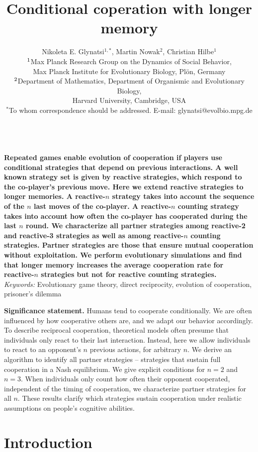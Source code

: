 \documentclass[11pt]{article}
\title{\bfseries \sffamily \Large Conditional coperation with longer memory}
\author{Nikoleta E. Glynatsi$^{1,*}$, Martin Nowak$^2$, Christian Hilbe$^1$\\[0.3cm]
$^{\rm 1}$Max Planck Research Group on the Dynamics of Social Behavior,\\ Max Planck Institute for Evolutionary Biology, Pl\"{o}n, Germany \\
$^{\rm 2}$Department of Mathematics,
Department of Organismic and Evolutionary Biology,\\ Harvard University, Cambridge, USA\\
$^*$To whom correspondence should be addressed. E-mail: glynatsi@evolbio.mpg.de
}
\date{}
\begin{document}
\maketitle

~\\[0.5cm]
\noindent
{\bf 
Repeated games enable evolution of cooperation if players use conditional
strategies that depend on previous interactions. A well known strategy set is
given by reactive strategies, which respond to the co-player's previous move.
Here we extend reactive strategies to longer memories. A reactive-$n$ strategy
takes into account the sequence of the $n$ last moves of the co-player. A
reactive-$n$ counting strategy takes into account how often the co-player has
cooperated during the last $n$ round. We characterize all partner strategies among
reactive-2 and reactive-3 strategies as well as among reactive-$n$ counting
strategies. Partner strategies are those that ensure mutual cooperation without
exploitation. We perform evolutionary simulations and find that longer memory
increases the average cooperation rate for reactive-$n$ strategies but not for
reactive counting strategies.
}\\[1cm]


\noindent
{\it Keywords:} Evolutionary game theory, direct reciprocity, evolution of cooperation, prisoner's dilemma



\clearpage
\newpage

\noindent
{\bf Significance statement.} Humans tend to cooperate conditionally. 
We are often influenced by how cooperative others are, and we adapt our behavior accordingly. 
To describe reciprocal cooperation, theoretical models often presume that individuals only react to their last interaction. 
Instead, here we allow individuals to react to an opponent's $n$ previous actions, for arbitrary $n$.
We derive an algorithm to identify all partner strategies -- strategies that sustain full cooperation in a Nash equilibrium.
We give explicit conditions for $n\!=\!2$ and $n\!=\!3$. 
When individuals only count how often their opponent cooperated, independent of the timing of cooperation, we characterize partner strategies for all $n$.
These results clarify which strategies sustain cooperation under realistic assumptions on people's cognitive abilities. 

\section*{Introduction}
\end{document}
